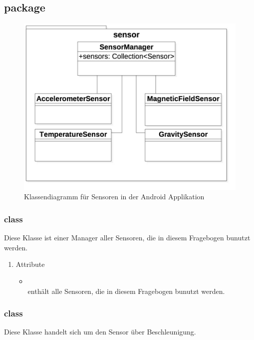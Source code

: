 \documentclass[a4paper]{scrreprt}
\begin{document}
{            \subsection{package }
            \begin{figure}[H]
                \centering
                \includegraphics[scale = 0.5]{ClassDiagramAppSensor.jpg}
                \caption{Klassendiagramm für Sensoren in der Android Applikation }
            \end{figure}
                \subsubsection{class }
                Diese Klasse ist einer Manager aller Sensoren, die in diesem Fragebogen bunutzt werden.
                \begin{enumerate}
                  \item Attribute
                    \begin{itemize}
                      \item {\large{}}\\
                      enthält alle Sensoren, die in diesem Fragebogen bunutzt werden.
                    \end{itemize}
                \end{enumerate}
                \subsubsection{class }
                Diese Klasse handelt sich um den Sensor über Beschleunigung.
}
\end{document}

